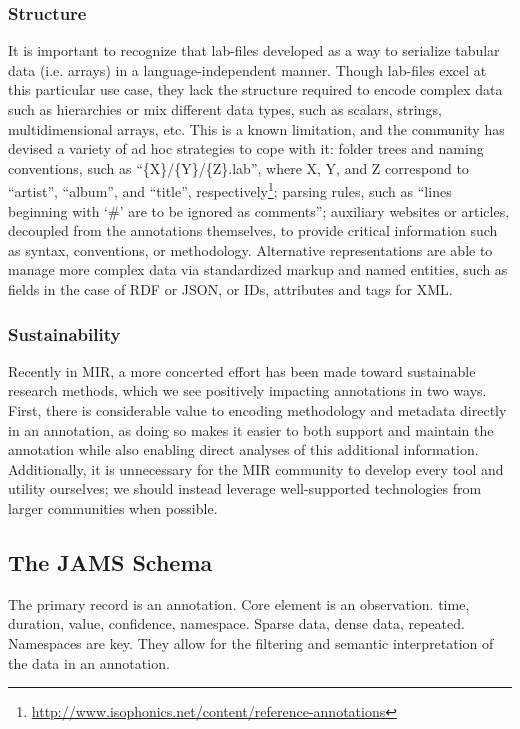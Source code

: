 \subsubsection{Structure}
\label{subsubsec:structure}
It is important to recognize that lab-files developed as a way to serialize tabular data (i.e. arrays) in a language-independent manner.
Though lab-files excel at this particular use case, they lack the structure required to encode complex data such as hierarchies or mix different data types, such as scalars, strings, multidimensional arrays, etc.
This is a known limitation, and the community has devised a variety of ad hoc strategies to cope with it: folder trees and naming conventions, such as ``\{X\}/\{Y\}/\{Z\}.lab'', where X, Y, and Z correspond to ``artist'', ``album'', and ``title'', respectively\footnote{\url{http://www.isophonics.net/content/reference-annotations}}; parsing rules, such as ``lines beginning with `\#' are to be ignored as comments''; auxiliary websites or articles, decoupled from the annotations themselves, to provide critical information such as syntax, conventions, or methodology.
Alternative representations are able to manage more complex data via standardized markup and named entities, such as fields in the case of RDF or JSON, or IDs, attributes and tags for XML.

\subsubsection{Sustainability}
\label{subsubsec:sustainability}

Recently in MIR, a more concerted effort has been made toward sustainable research methods, which we see positively impacting annotations in two ways.
First, there is considerable value to encoding methodology and metadata directly in an annotation, as doing so makes it easier to both support and maintain the annotation while also enabling direct analyses of this additional information.
Additionally, it is unnecessary for the MIR community to develop every tool and utility ourselves; we should instead leverage well-supported technologies from larger communities when possible.

\subsection{The JAMS Schema}
\label{subsec:schema}

The primary record is an annotation.
Core element is an observation.
time, duration, value, confidence, namespace.
Sparse data, dense data, repeated.
Namespaces are key.
They allow for the filtering and semantic interpretation of the data in an annotation.

